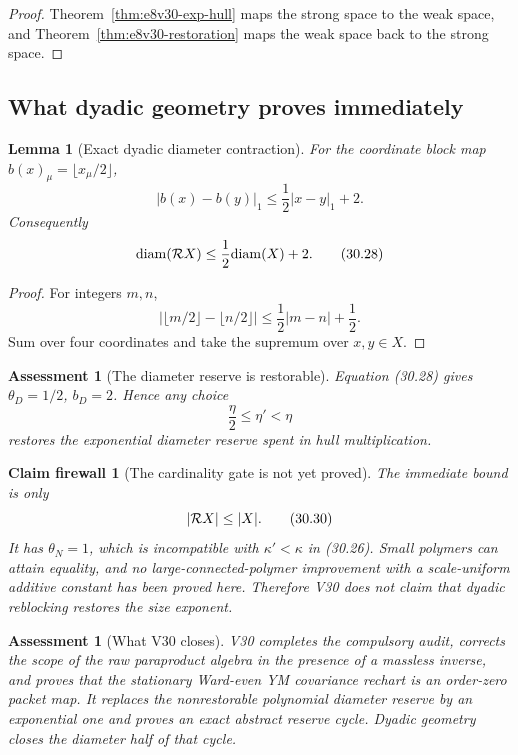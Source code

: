 \documentclass[11pt,oneside]{book}
\newtheorem{lemma}[theorem]{Lemma}
\newtheorem{assessment}[theorem]{Assessment}
\newtheorem{firewall}[theorem]{Claim firewall}
\theoremstyle{definition}
\theoremstyle{remark}
\begin{document}
\begin{proof}
Theorem~\ref{thm:e8v30-exp-hull} maps the strong space to the weak
space, and Theorem~\ref{thm:e8v30-restoration} maps the weak space
back to the strong space.
\end{proof}

\subsection{What dyadic geometry proves immediately}

\begin{lemma}[Exact dyadic diameter contraction]
\label{lem:e8v30-diameter}
For the coordinate block map \(b(x)_\mu=\lfloor x_\mu/2\rfloor\),
\[
 |b(x)-b(y)|_1\leq\frac12|x-y|_1+2.                              \tag{30.27}
\]
Consequently
\[
 {\rm diam}({\cal R}X)
 \leq\frac12{\rm diam}(X)+2.                                    \tag{30.28}
\]
\end{lemma}

\begin{proof}
For integers \(m,n\),
\[
 |\lfloor m/2\rfloor-\lfloor n/2\rfloor|
 \leq\frac12|m-n|+\frac12.
\]
Sum over four coordinates and take the supremum over \(x,y\in X\).
\end{proof}

\begin{assessment}[The diameter reserve is restorable]
\label{ass:e8v30-diameter-restored}
Equation (30.28) gives \(\theta_D=1/2\), \(b_D=2\).  Hence any choice
\[
                         \frac{\eta}{2}\leq\eta'<\eta             \tag{30.29}
\]
restores the exponential diameter reserve spent in hull multiplication.
\end{assessment}

\begin{firewall}[The cardinality gate is not yet proved]
\label{fire:e8v30-cardinality}
The immediate bound is only
\[
                              |{\cal R}X|\leq|X|.                 \tag{30.30}
\]
It has \(\theta_N=1\), which is incompatible with
\(\kappa'<\kappa\) in (30.26).  Small polymers can attain equality,
and no large-connected-polymer improvement with a scale-uniform
additive constant has been proved here.  Therefore V30 does not claim
that dyadic reblocking restores the size exponent.
\end{firewall}

\begin{assessment}[What V30 closes]
\label{ass:e8v30-closes}
V30 completes the compulsory audit, corrects the scope of the raw
paraproduct algebra in the presence of a massless inverse, and proves
that the stationary Ward-even YM covariance rechart is an order-zero
packet map.  It replaces the nonrestorable polynomial diameter reserve
by an exponential one and proves an exact abstract reserve cycle.
Dyadic geometry closes the diameter half of that cycle.
\end{assessment}
\end{document}
